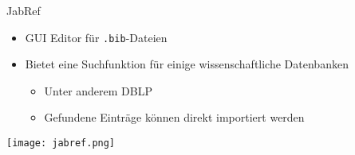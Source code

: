 \documentclass[aspectratio=169]{beamer}
\providecommand{\tightlist}{\setlength{\itemsep}{0pt}\setlength{\parskip}{0pt}}
\newcommand\citestyle[1]{\textcolor{foreground-secondary}{\textsuperscript{#1}}}
\let\oldautocite\autocite
\renewcommand{\autocite}[1]{\citestyle{\oldautocite{#1}}}
\begin{document}
    \begin{frame}[fragile]{JabRef}
    \protect\hypertarget{jabref}{}
    \begin{minipage}{0.4\textwidth}

    \begin{itemize}
    \tightlist
    \item
      GUI Editor für \texttt{.bib}-Dateien \autocite{jabref}
    \item
      Bietet eine Suchfunktion für einige wissenschaftliche Datenbanken

      \begin{itemize}
      \tightlist
      \item
        Unter anderem DBLP
      \item
        Gefundene Einträge können direkt importiert werden
      \end{itemize}
    \end{itemize}

    \end{minipage}\begin{minipage}{0.6\textwidth}

    \texttt{[image: jabref.png]}

    \end{minipage}
    \end{frame}
\end{document}
